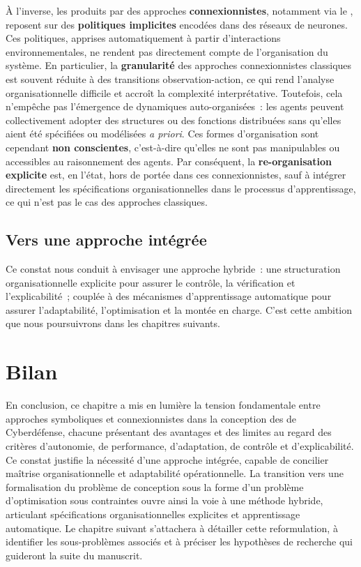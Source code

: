 À l'inverse, les  produits par des approches \textbf{connexionnistes}, notamment via le , reposent sur des \textbf{politiques implicites} encodées dans des réseaux de neurones. Ces politiques, apprises automatiquement à partir d'interactions environnementales, ne rendent pas directement compte de l'organisation du système. En particulier, la \textbf{granularité} des approches connexionnistes classiques est souvent réduite à des transitions observation-action, ce qui rend l'analyse organisationnelle difficile et accroît la complexité interprétative. Toutefois, cela n'empêche pas l'émergence de dynamiques auto-organisées~: les agents peuvent collectivement adopter des structures ou des fonctions distribuées sans qu'elles aient été spécifiées ou modélisées \textit{a priori}. Ces formes d'organisation sont cependant \textbf{non conscientes}, c'est-à-dire qu'elles ne sont pas manipulables ou accessibles au raisonnement des agents. Par conséquent, la \textbf{re-organisation explicite} est, en l'état, hors de portée dans ces  connexionnistes, sauf à intégrer directement les spécifications organisationnelles dans le processus d'apprentissage, ce qui n'est pas le cas des approches  classiques.

\subsection*{Vers une approche intégrée}

Ce constat nous conduit à envisager une approche hybride~: une structuration organisationnelle explicite pour assurer le contrôle, la vérification et l'explicabilité~; couplée à des mécanismes d'apprentissage automatique pour assurer l'adaptabilité, l'optimisation et la montée en charge. C'est cette ambition que nous poursuivrons dans les chapitres suivants.

\section*{Bilan}
En conclusion, ce chapitre a mis en lumière la tension fondamentale entre approches symboliques et connexionnistes dans la conception des  de Cyberdéfense, chacune présentant des avantages et des limites au regard des critères d’autonomie, de performance, d’adaptation, de contrôle et d’explicabilité. Ce constat justifie la nécessité d’une approche intégrée, capable de concilier maîtrise organisationnelle et adaptabilité opérationnelle. La transition vers une formalisation du problème de conception sous la forme d’un problème d’optimisation sous contraintes ouvre ainsi la voie à une méthode hybride, articulant spécifications organisationnelles explicites et apprentissage automatique. Le chapitre suivant s’attachera à détailler cette reformulation, à identifier les sous-problèmes associés et à préciser les hypothèses de recherche qui guideront la suite du manuscrit.


